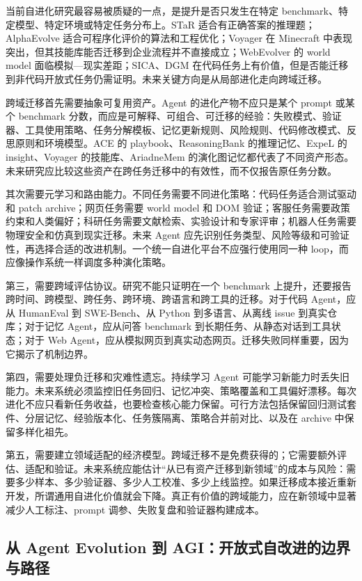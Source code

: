 当前自进化研究最容易被质疑的一点，是提升是否只发生在特定 benchmark、特定模型、特定环境或特定任务分布上。STaR 适合有正确答案的推理题；AlphaEvolve 适合可程序化评价的算法和工程优化；Voyager 在 Minecraft 中表现突出，但其技能库能否迁移到企业流程并不直接成立；WebEvolver 的 world model 面临模拟---现实差距；SICA、DGM 在代码任务上有价值，但是否能迁移到非代码开放式任务仍需证明。未来关键方向是从局部进化走向跨域迁移。

跨域迁移首先需要抽象可复用资产。Agent 的进化产物不应只是某个 prompt 或某个 benchmark 分数，而应是可解释、可组合、可迁移的经验：失败模式、验证器、工具使用策略、任务分解模板、记忆更新规则、风险规则、代码修改模式、反思原则和环境模型。ACE 的 playbook、ReasoningBank 的推理记忆、ExpeL 的 insight、Voyager 的技能库、AriadneMem 的演化图记忆都代表了不同资产形态。未来研究应比较这些资产在跨任务迁移中的有效性，而不仅报告原任务分数。

其次需要元学习和路由能力。不同任务需要不同进化策略：代码任务适合测试驱动和 patch archive；网页任务需要 world model 和 DOM 验证；客服任务需要政策约束和人类偏好；科研任务需要文献检索、实验设计和专家评审；机器人任务需要物理安全和仿真到现实迁移。未来 Agent 应先识别任务类型、风险等级和可验证性，再选择合适的改进机制。一个统一自进化平台不应强行使用同一种 loop，而应像操作系统一样调度多种演化策略。

第三，需要跨域评估协议。研究不能只证明在一个 benchmark 上提升，还要报告跨时间、跨模型、跨任务、跨环境、跨语言和跨工具的迁移。对于代码 Agent，应从 HumanEval 到 SWE-Bench、从 Python 到多语言、从离线 issue 到真实仓库；对于记忆 Agent，应从问答 benchmark 到长期任务、从静态对话到工具状态；对于 Web Agent，应从模拟网页到真实动态网页。迁移失败同样重要，因为它揭示了机制边界。

第四，需要处理负迁移和灾难性遗忘。持续学习 Agent 可能学习新能力时丢失旧能力。未来系统必须监控旧任务回归、记忆冲突、策略覆盖和工具偏好漂移。每次进化不应只看新任务收益，也要检查核心能力保留。可行方法包括保留回归测试套件、分层记忆、经验版本化、任务簇隔离、策略合并前对比、以及在 archive 中保留多样化祖先。

第五，需要建立领域适配的经济模型。跨域迁移不是免费获得的；它需要额外评估、适配和验证。未来系统应能估计``从已有资产迁移到新领域''的成本与风险：需要多少样本、多少验证器、多少人工校准、多少上线监控。如果迁移成本接近重新开发，所谓通用自进化价值就会下降。真正有价值的跨域能力，应在新领域中显著减少人工标注、prompt 调参、失败复盘和验证器构建成本。

\subsection{从 Agent Evolution 到 AGI：开放式自改进的边界与路径}\label{sec:ch8-agi}


